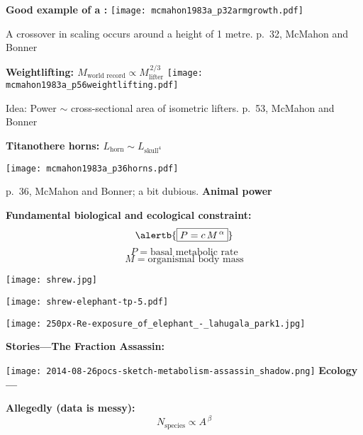   \textbf{Good example of a :}
    \texttt{[image: mcmahon1983a\_p32armgrowth.pdf]}

    A \alert{crossover} in scaling occurs around a height of 1 metre.
  \small{p.\ 32, McMahon and Bonner\cite{mcmahon1983a}}

  \textbf{Weightlifting: $M_{\textrm{world record}} \propto M_{\textrm{lifter}}^{\, 2/3}$}
    \texttt{[image: mcmahon1983a\_p56weightlifting.pdf]}
    
    Idea: Power $\sim$ cross-sectional area of isometric lifters.
  \small{p.\ 53, McMahon and Bonner\cite{mcmahon1983a}}

  \textbf{Titanothere horns: $L_{\textrm{horn}} \sim L_{\textrm{skull}^4}$}
    \begin{center}
      \texttt{[image: mcmahon1983a\_p36horns.pdf]}    
    \end{center}
  \small{p.\ 36, McMahon and Bonner\cite{mcmahon1983a}; a bit dubious.}
  \textbf{Animal power}

  \textbf{Fundamental biological and ecological constraint:}
    $$
    \alertb{\boxed{P = c\, M^{\, \alpha}}}
    $$
    $$P = \mbox{basal metabolic rate}$$
    $$M = \mbox{organismal body mass}$$

      
      \texttt{[image: shrew.jpg]}
      
        \texttt{[image: shrew-elephant-tp-5.pdf]}
      
      \texttt{[image: 250px-Re-exposure\_of\_elephant\_-\_lahugala\_park1.jpg]}
  
  \textbf{Stories---The Fraction Assassin:}

  \texttt{[image: 2014-08-26pocs-sketch-metabolism-assassin\_shadow.png]}
  \textbf{Ecology---}

  \textbf{Allegedly (data is messy):\cite{macarthur1963a,levin1992a}}
      $$
      N_{\textrm{species}} \propto A^{\, \beta}
      $$
     
